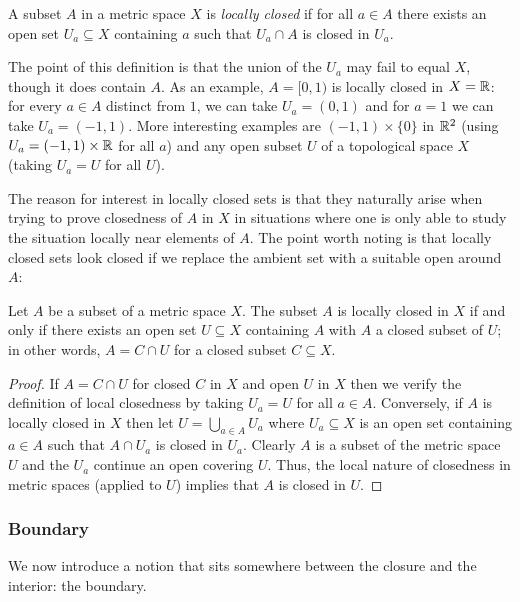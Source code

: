 \begin{definition}
  A subset \(A\) in a metric space \(X\) is \emph{locally closed} if for
  all \(a\in A\) there exists an open set \(U_a\subseteq X\) containing
  \(a\) such that \(U_a\cap A\) is closed in \(U_a\).
\end{definition}

The point of this definition is that the union of the \(U_a\) may fail to
equal \(X\), though it does contain \(A\). As an example, \(A=[0,1)\) is
locally closed in \(X=\mathbb{R}\): for every \(a\in A\) distinct from \(1\), we
can take \(U_a=(0,1)\) and for \(a=1\) we can take \(U_a=(-1,1)\). More
interesting examples are \((-1,1)\times\{0\}\) in \(\mathbb{R}^2\) (using
\(U_a=(-1,1)\times\mathbb{R}\) for all \(a\)) and any open subset \(U\) of a
topological space \(X\) (taking \(U_a=U\) for all \(U\)).

The reason for interest in locally closed sets is that they naturally arise
when trying to prove closedness of \(A\) in \(X\) in situations where one
is only able to study the situation locally near elements of \(A\). The
point worth noting is that locally closed sets look closed if we replace
the ambient set with a suitable open around \(A\):

\begin{theorem}
  Let \(A\) be a subset of a metric space \(X\). The subset \(A\) is
  locally closed in \(X\) if and only if there exists an open set
  \(U\subseteq X\) containing \(A\) with \(A\) a closed subset of \(U\); in
  other words, \(A=C\cap U\) for a closed subset \(C\subseteq X\).
\end{theorem}
\begin{proof}
  If \(A=C\cap U\) for closed \(C\) in \(X\) and open \(U\) in \(X\) then
  we verify the definition of local closedness by taking \(U_a=U\) for all
  \(a\in A\). Conversely, if \(A\) is locally closed in \(X\) then let
  \(U=\bigcup_{a\in A}U_a\) where \(U_a\subseteq X\) is an open set
  containing \(a\in A\) such that \(A\cap U_a\) is closed in
  \(U_a\). Clearly \(A\) is a subset of the metric space \(U\) and the
  \(U_a\) continue an open covering \(U\). Thus, the local nature of
  closedness in metric spaces (applied to \(U\)) implies that \(A\) is
  closed in \(U\).
\end{proof}

\subsubsection{Boundary}
We now introduce a notion that sits somewhere between the closure and the
interior: the boundary.

